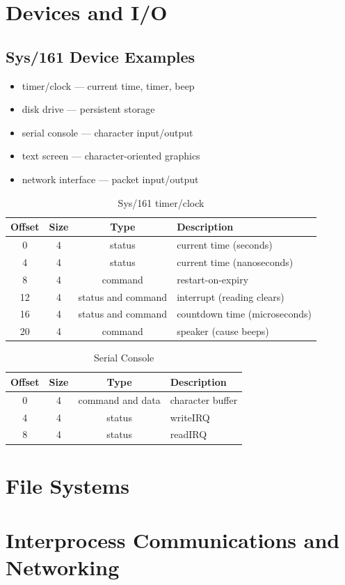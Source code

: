 \documentclass[12pt]{article}
\theoremstyle{plain}
\theoremstyle{definition}
\begin{document}
\newpage
\section{Devices and I/O}
\subsection{Sys/161 Device Examples}
\begin{itemize}
  \item timer/clock --- current time, timer, beep
  \item disk drive --- persistent storage
  \item serial console --- character input/output
  \item text screen --- character-oriented graphics
  \item network interface --- packet input/output
\end{itemize}

\begin{table}[H]
  \vspace{-20pt}
  \caption{Sys/161 timer/clock}
  \label{tab:sys161_timer}
  \centering

  \begin{tabular}{|c|c|c|l|}
  \hline
  Offset & Size & Type & Description \\ \hline \hline
  0 & 4 & status & current time (seconds) \\ \hline
  4 & 4 & status & current time (nanoseconds) \\ \hline
  8 & 4 & command & restart-on-expiry \\ \hline
  12 & 4 & status and command & interrupt (reading clears) \\ \hline
  16 & 4 & status and command & countdown time (microseconds) \\ \hline
  20 & 4 & command & speaker (cause beeps) \\ \hline
  \end{tabular}
\end{table}

\begin{table}[H]
  \vspace{-20pt}
  \caption{Serial Console}
  \label{tab:serial_con}
  \centering

  \begin{tabular}{|c|c|c|l|}
  \hline
  Offset & Size & Type & Description \\ \hline \hline
  0 & 4 & command and data & character buffer \\ \hline
  4 & 4 & status & writeIRQ \\ \hline
  8 & 4 & status & readIRQ \\ \hline
  \end{tabular}
\end{table}

\newpage
\section{File Systems}

\newpage
\section{Interprocess Communications and Networking}

\clearpage
\printindex
\end{document}
